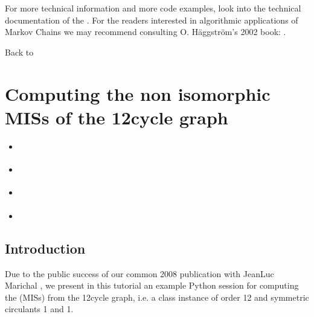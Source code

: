 \documentclass[a4paper,12pt,english]{sphinxhowto}
\begin{document}
For more technical information and more code examples, look into the technical documentation of the . For the readers interested in algorithmic applications of Markov Chains we may recommend consulting O. Häggström’s 2002 book: .

Back to {\hyperref[\detokenize{tutorial:tutorial-label}]{}}


\section{Computing the non isomorphic MISs of the 12\sphinxhyphen{}cycle graph}
\label{\detokenize{tutorial:computing-the-non-isomorphic-miss-of-the-12-cycle-graph}}\label{\detokenize{tutorial:isomorphicmis-tutorial-label}}
\begin{sphinxShadowBox}
\begin{itemize}
\item {} 
\label{\detokenize{tutorial:id220}}{\hyperref[\detokenize{tutorial:id69}]{}}

\item {} 
\label{\detokenize{tutorial:id221}}{\hyperref[\detokenize{tutorial:computing-the-maximal-independent-sets-miss}]{}}

\item {} 
\label{\detokenize{tutorial:id222}}{\hyperref[\detokenize{tutorial:computing-the-automorphism-group}]{}}

\item {} 
\label{\detokenize{tutorial:id223}}{\hyperref[\detokenize{tutorial:computing-the-isomorphic-miss}]{}}

\end{itemize}
\end{sphinxShadowBox}


\subsection{Introduction}
\label{\detokenize{tutorial:id69}}
Due to the public success of our common 2008 publication with Jean\sphinxhyphen{}Luc Marichal  , we present in this tutorial an example Python session for computing the  (MISs) from the 12\sphinxhyphen{}cycle graph, i.e. a  class instance of order 12 and symmetric circulants 1 and \sphinxhyphen{}1.
\end{document}
